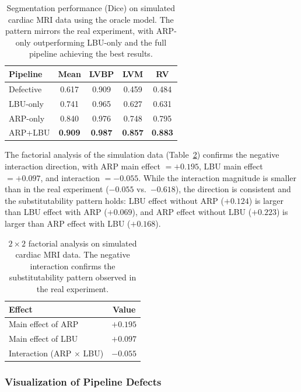 \documentclass[10pt,twocolumn]{article}
\begin{document}
\begin{table}[t]
\centering
\caption{Segmentation performance (Dice) on simulated cardiac MRI data using the oracle model. The pattern mirrors the real experiment, with ARP-only outperforming LBU-only and the full pipeline achieving the best results.}
\label{tab:sim_results}
\begin{tabular}{lcccc}
\toprule
Pipeline & Mean & LVBP & LVM & RV \\
\midrule
Defective & 0.617 & 0.909 & 0.459 & 0.484 \\
LBU-only  & 0.741 & 0.965 & 0.627 & 0.631 \\
ARP-only  & 0.840 & 0.976 & 0.748 & 0.795 \\
ARP+LBU   & \textbf{0.909} & \textbf{0.987} & \textbf{0.857} & \textbf{0.883} \\
\bottomrule
\end{tabular}
\end{table}

The factorial analysis of the simulation data (Table~\ref{tab:sim_factorial}) confirms the negative interaction direction, with ARP main effect $= +0.195$, LBU main effect $= +0.097$, and interaction $= -0.055$.
While the interaction magnitude is smaller than in the real experiment ($-0.055$ vs.\ $-0.618$), the direction is consistent and the substitutability pattern holds: LBU effect without ARP ($+0.124$) is larger than LBU effect with ARP ($+0.069$), and ARP effect without LBU ($+0.223$) is larger than ARP effect with LBU ($+0.168$).

\begin{table}[t]
\centering
\caption{$2\times2$ factorial analysis on simulated cardiac MRI data. The negative interaction confirms the substitutability pattern observed in the real experiment.}
\label{tab:sim_factorial}
\begin{tabular}{lc}
\toprule
Effect & Value \\
\midrule
Main effect of ARP  & $+0.195$ \\
Main effect of LBU  & $+0.097$ \\
Interaction (ARP $\times$ LBU) & $-0.055$ \\
\bottomrule
\end{tabular}
\end{table}

\subsubsection{Visualization of Pipeline Defects}
\end{document}
